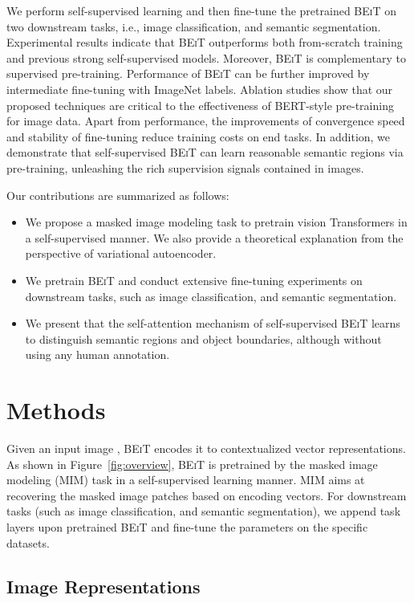 \documentclass{article}
\newcommand\our{\textsc{BEiT}}
\begin{document}
We perform self-supervised learning and then fine-tune the pretrained \our{} on two downstream tasks, i.e., image classification, and semantic segmentation.
Experimental results indicate that \our{} outperforms both from-scratch training and previous strong self-supervised models.
Moreover, \our{} is complementary to supervised pre-training. Performance of \our{} can be further improved by intermediate fine-tuning with ImageNet labels.
Ablation studies show that our proposed techniques are critical to the effectiveness of BERT-style pre-training for image data.
Apart from performance, the improvements of convergence speed and stability of fine-tuning reduce training costs on end tasks.
In addition, we demonstrate that self-supervised \our{} can learn reasonable semantic regions via pre-training, unleashing the rich supervision signals contained in images.

Our contributions are summarized as follows:
\begin{itemize}[leftmargin=1.5em]
\item We propose a masked image modeling task to pretrain vision Transformers in a self-supervised manner. We also provide a theoretical explanation from the perspective of variational autoencoder.
\item We pretrain \our{} and conduct extensive fine-tuning experiments on downstream tasks, such as image classification, and semantic segmentation.
\item We present that the self-attention mechanism of self-supervised \our{} learns to distinguish semantic regions and object boundaries, although without using any human annotation.
\end{itemize}


\section{Methods}
\label{sec:methods}


Given an input image , \our{} encodes it to contextualized vector representations.
As shown in Figure~\ref{fig:overview}, \our{} is pretrained by the masked image modeling (MIM) task in a self-supervised learning manner.
MIM aims at recovering the masked image patches based on encoding vectors.
For downstream tasks (such as image classification, and semantic segmentation), we append task layers upon pretrained \our{} and fine-tune the parameters on the specific datasets.


\subsection{Image Representations}
\label{sec:image:repr}
\end{document}
